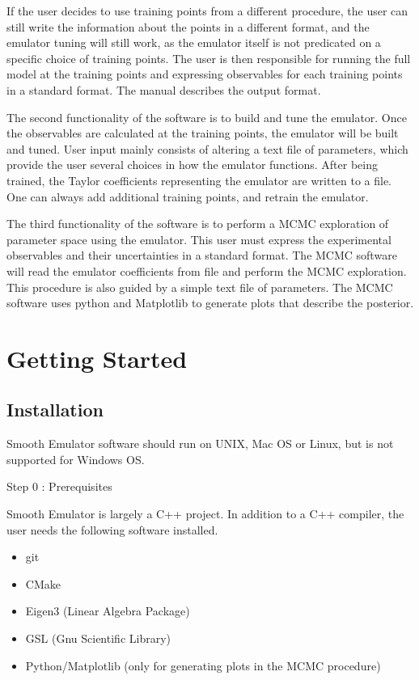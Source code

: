 \documentclass[12pt]{article}
\numberwithin{equation}{section}
\numberwithin{figure}{section}
\begin{document}
 If the user decides to use training points from a different procedure, the user can still write the information about the points in a different format, and the emulator tuning will still work, as the emulator itself is not predicated on a specific choice of training points. The user is then responsible for running the full model at the training points and expressing observables for each training points in a standard format. The manual describes the output format.

 The second functionality of the software is to build and tune the emulator. Once the observables are calculated at the training points, the emulator will be built and tuned. User input mainly consists of altering a text file of parameters, which provide the user several choices in how the emulator functions. After being trained, the Taylor coefficients representing the emulator are written to a file. One can always add additional training points, and retrain the emulator. 

The third functionality of the software is to perform a MCMC exploration of parameter space using the emulator. This user must express the experimental observables and their uncertainties in a standard format. The MCMC software will read the emulator coefficients from file and perform the MCMC exploration. This procedure is also guided by a simple text file of parameters. The MCMC software uses python and Matplotlib to generate plots that describe the posterior. 

\section{Getting Started}\label{sec:simplex}

\subsection{Installation}

Smooth Emulator software should run on UNIX, Mac OS or Linux, but is not supported for Windows OS.

\begin{description}
\item[Step 0 : Prerequisites] 
\end{description}

Smooth Emulator is largely a C++ project. In addition to a C++ compiler, the user needs the following software installed.

\begin{itemize}
    \item git
    \item CMake
    \item Eigen3 (Linear Algebra Package)
    \item GSL (Gnu Scientific Library)
    \item Python/Matplotlib (only for generating plots in the MCMC procedure)
\end{itemize}
\end{document}
